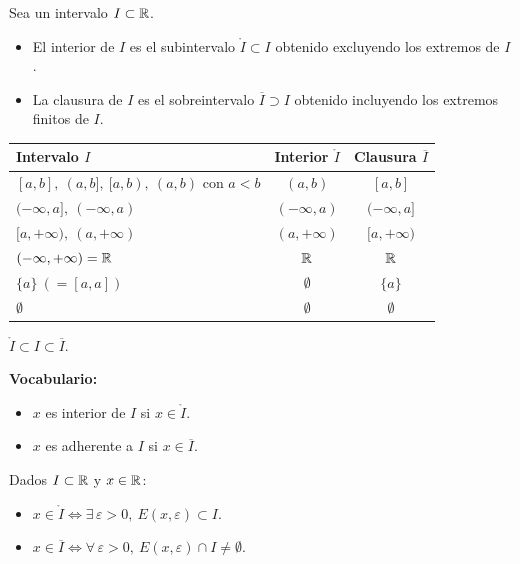 \documentclass[11pt,a4paper]{article}
\newcommand{\Int}[1]{\mathring{#1}}     %
\newcommand{\Cl}[1]{\overline{#1}}      %
\begin{document}
\begin{definicion}
Sea un intervalo $I\subset\mathbb{R}$.
\begin{itemize}
  \item El interior de $I$ es el subintervalo $\Int{I}\subset I$ obtenido excluyendo los extremos de $I$.
  \item La clausura de $I$ es el sobreintervalo $\Cl{I}\supset I$ obtenido incluyendo los extremos finitos de $I$.
\end{itemize}
\end{definicion}

\begin{center}
\renewcommand{\arraystretch}{1.3}
\begin{tabular}{l|c|c}
\toprule
Intervalo $I$ & Interior $\Int{I}$ & Clausura $\Cl{I}$ \\
\midrule
$[a,b],\ (a,b],\ [a,b),\ (a,b)$ \quad con $a<b$ & $(a,b)$ & $[a,b]$ \\
$(-\infty,a],\ (-\infty,a)$ & $(-\infty,a)$ & $(-\infty,a]$ \\
$[a,+\infty),\ (a,+\infty)$ & $(a,+\infty)$ & $[a,+\infty)$ \\
$(-\infty,+\infty)=\mathbb{R}$ & $\mathbb{R}$ & $\mathbb{R}$ \\
$\{a\}\ (=[a,a])$ & $\emptyset$ & $\{a\}$ \\
$\emptyset$ & $\emptyset$ & $\emptyset$ \\
\bottomrule
\end{tabular}
\end{center}

\begin{observacion}
$\Int{I}\subset I\subset \Cl{I}$.
\end{observacion}

\textbf{Vocabulario:}
\begin{itemize}
  \item $x$ es interior de $I$ si $x\in\Int{I}$.
  \item $x$ es adherente a $I$ si $x\in\Cl{I}$.
\end{itemize}

\begin{proposicion}
Dados $I\subset\mathbb{R}$ y $x\in\mathbb{R}$:
\begin{itemize}
  \item $x\in\Int{I} \iff \exists\,\varepsilon>0,\ E(x,\varepsilon)\subset I$.
  \item $x\in\Cl{I} \iff \forall\,\varepsilon>0,\ E(x,\varepsilon)\cap I\neq\emptyset$.
\end{itemize}
\end{proposicion}
\end{document}
